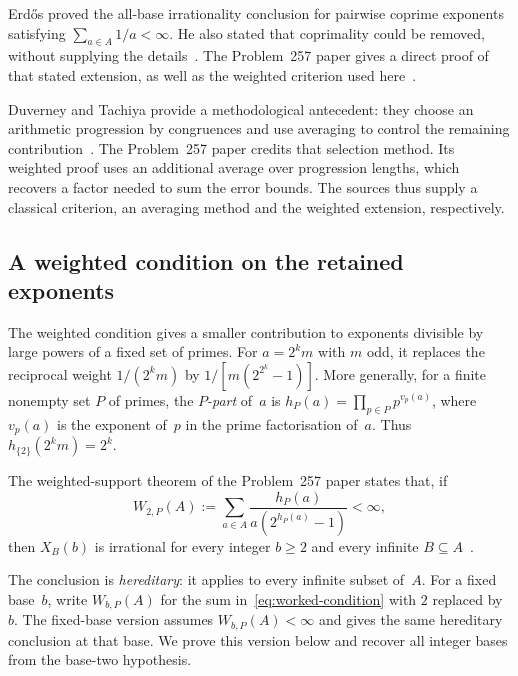 \documentclass[10pt]{article}
\begin{document}
Erd\H{o}s proved the all-base irrationality conclusion for pairwise coprime exponents satisfying $\sum_{a\in A}1/a<\infty$. He also stated that coprimality could be removed, without supplying the details~\cite[pp.~222, 226]{erdos1968}. The Problem~257 paper gives a direct proof of that stated extension, as well as the weighted criterion used here~\cite{paper257}.

Duverney and Tachiya provide a methodological antecedent: they choose an arithmetic progression by congruences and use averaging to control the remaining contribution~\cite[Section~2, (2.3)--(2.9)]{duverneytachiya}. The Problem~257 paper credits that selection method. Its weighted proof uses an additional average over progression lengths, which recovers a factor needed to sum the error bounds. The sources thus supply a classical criterion, an averaging method and the weighted extension, respectively.
\par{}

\subsection{A weighted condition on the retained exponents}

The weighted condition gives a smaller contribution to exponents divisible by large powers of a fixed set of primes. For $a=2^km$ with $m$ odd, it replaces the reciprocal weight $1/(2^km)$ by $1/[m(2^{2^k}-1)]$. More generally, for a finite nonempty set $P$ of primes, the \emph{$P$-part} of~$a$ is
$h_P(a)=\prod_{p\in P}p^{v_p(a)}$, where $v_p(a)$ is the exponent of~$p$ in the prime factorisation of~$a$. Thus $h_{\{2\}}(2^km)=2^k$.
\par{}

The weighted-support theorem of the Problem~257 paper states that, if
\begin{equation}\label{eq:worked-condition}
 W_{2,P}(A):=\sum_{a\in A}\frac{h_P(a)}{a(2^{h_P(a)}-1)}<\infty,
\end{equation}
then $X_B(b)$ is irrational for every integer $b\ge2$ and every infinite $B\subseteq A$~\cite[Theorem~1.2]{paper257}.

The conclusion is \emph{hereditary}: it applies to every infinite subset of~$A$. For a fixed base~$b$, write $W_{b,P}(A)$ for the sum in~\eqref{eq:worked-condition} with $2$ replaced by~$b$. The fixed-base version assumes $W_{b,P}(A)<\infty$ and gives the same hereditary conclusion at that base. We prove this version below and recover all integer bases from the base-two hypothesis.
\end{document}
